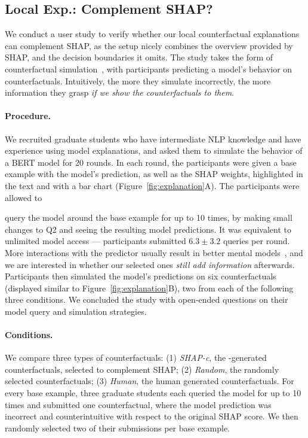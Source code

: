 \subsection{Local Exp.: Complement SHAP?}
\label{subsec:exp_user_study}

We conduct a user study to verify whether our local counterfactual explanations can complement SHAP, as the setup nicely combines the overview provided by SHAP, and the decision boundaries it omits.
The study takes the form of counterfactual simulation~\cite{hase2020evaluating}, with participants predicting a model's behavior on counterfactuals.
Intuitively, the more they simulate incorrectly, the more information they grasp \emph{if we show the counterfactuals to them}.

\paragraph{Procedure.}
We recruited  graduate students who have intermediate NLP knowledge and have experience using model explanations, and asked them to simulate the behavior of a \qqp BERT model for 20 rounds.
In each round, the participants were given a base example with the model's prediction, as well as the SHAP weights, highlighted in the text and with a bar chart (Figure~\ref{fig:explanation}A).
The participants were allowed to 

query the model around the base example for up to 10 times, by making small changes to Q2 and seeing the resulting model predictions.
It was equivalent to unlimited model access --- participants submitted $6.3\pm3.2$ queries per round.
More interactions with the predictor usually result in better mental models~\cite{miller}, and we are interested in whether our selected ones \emph{still add information} afterwards.
Participants then simulated the model's predictions on six counterfactuals (displayed similar to Figure~\ref{fig:explanation}B), two from each of the following three conditions.
We concluded the study with open-ended questions on their model query and simulation strategies.



\newcommand{\cshap}{\emph{SHAP-c}\xspace}
\newcommand{\crandom}{\emph{Random}\xspace}
\newcommand{\chuman}{\emph{Human}\xspace}
\paragraph{Conditions.} 
We compare three types of counterfactuals:
(1) \cshap, the \sysname-generated counterfactuals, selected to complement SHAP; 
(2) \crandom, the randomly selected \sysname counterfactuals; 
(3) \chuman, the human generated counterfactuals.
For every base example, three graduate students each queried the model for up to 10 times and submitted one counterfactual, where the model prediction was incorrect and counterintuitive with respect to the original SHAP score.
We then randomly selected two of their submissions per base example.




